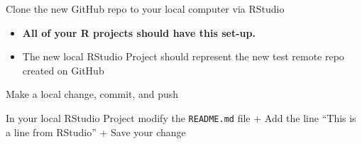 \documentclass[
  ignorenonframetext,
]{beamer}
\begin{document}
\begin{frame}[fragile]{Clone the new GitHub repo to your local computer
via RStudio}
\begin{itemize}
\item
  \textbf{All of your R projects should have this set-up.}
\item
  The new local RStudio Project should represent the new test remote
  repo created on GitHub
\end{itemize}

\end{frame}

\begin{frame}[fragile]{Make a local change, commit, and push}
\protect\hypertarget{make-a-local-change-commit-and-push}{}

In your local RStudio Project modify the \texttt{README.md} file + Add
the line ``This is a line from RStudio'' + Save your change

\end{frame}
\end{document}
